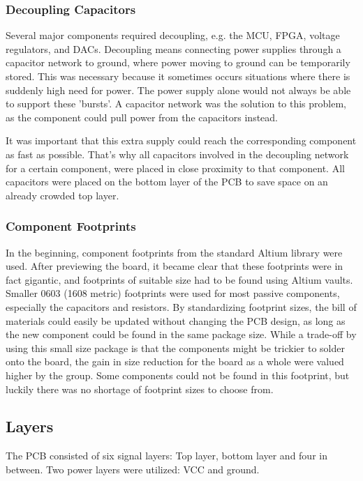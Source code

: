 \subsubsection{Decoupling Capacitors}
Several major components required decoupling, e.g. the MCU, FPGA, voltage regulators, and DACs.
Decoupling means connecting power supplies through a capacitor network to ground, where power moving to ground can be temporarily stored.
This was necessary because it sometimes occurs situations where there is suddenly high need for power.
The power supply alone would not always be able to support these 'bursts'.
A capacitor network was the solution to this problem, as the component could pull power from the capacitors instead.

It was important that this extra supply could reach the corresponding component as fast as possible.
That's why all capacitors involved in the decoupling network for a certain component, were placed in close proximity to that component.
All capacitors were placed on the bottom layer of the PCB to save space on an already crowded top layer.

\subsubsection{Component Footprints}
In the beginning, component footprints from the standard Altium library were used.
After previewing the board, it became clear that these footprints were in fact gigantic, and footprints of suitable size had to be found using Altium vaults.
Smaller 0603 (1608 metric) footprints were used for most passive components, especially the capacitors and resistors.
By standardizing footprint sizes, the bill of materials could easily be updated without changing the PCB design, as long as the new component could be found in the same package size.
While a trade-off by using this small size package is that the components might be trickier to solder onto the board, the gain in size reduction for the board as a whole were valued higher by the group.
Some components could not be found in this footprint, but luckily there was no shortage of footprint sizes to choose from.


\subsection{Layers}
The PCB consisted of six signal layers: Top layer, bottom layer and four in between.
Two power layers were utilized: VCC and ground.

